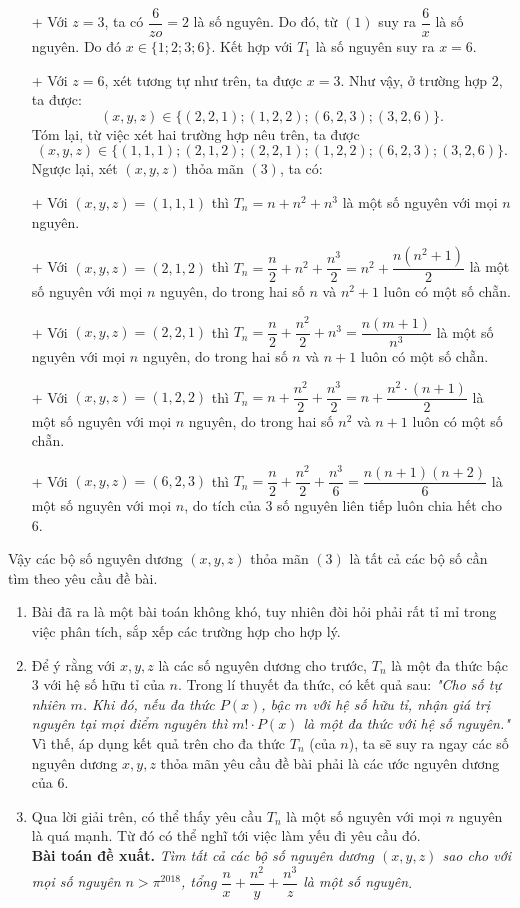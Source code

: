 \begin{bt}
{\begin{enumerate}[TH 1.]
\begin{itemize}
		\item[+] Với $z=3$, ta có $\dfrac{6}{zo}=2$ là số nguyên. Do đó, từ $(1)$ suy ra $\dfrac{6}{x}$ là số nguyên. Do đó $x \in \{1;2;3;6\}.$ Kết hợp với $T_1$ là số nguyên suy ra $x=6$.
		\item[+] Với $z=6$, xét tương tự như trên, ta được $x=3$.
		 Như vậy, ở trường hợp $2$, ta được:
		$$(x,y,z) \in \{(2,2,1); (1,2,2); (6,2,3); (3,2,6)\}.$$
		Tóm lại, từ việc xét hai trường hợp  nêu trên, ta được
		$$(x,y,z) \in \{(1,1,1); (2,1,2); (2,2,1); (1,2,2); (6,2,3); (3,2,6)\}.$$
		Ngược lại, xét $(x,y,z)$ thỏa mãn $(3)$, ta có:
		\item[+]  Với $(x,y,z)=(1,1,1)$ thì $T_n=n+n^2+n^3$ là một số nguyên với mọi $n$ nguyên.
		\item[+] Với $(x,y,z)=(2,1,2)$ thì $T_n=\dfrac{n}{2}+n^2+\dfrac{n^3}{2}=n^2+\dfrac{n(n^2+1)}{2}$ là một số nguyên với mọi $n$ nguyên, do trong hai số $n$ và $n^2+1$ luôn có một số chẵn.
		\item[+] Với $(x,y,z)=(2,2,1)$ thì $T_n=\dfrac{n}{2}+\dfrac{n^2}{2}+n^3=\dfrac{n(m+1)}{n^3}$ là một số nguyên với mọi $n$ nguyên, do trong hai số $n$ và $n+1$ luôn có một số chẵn.
		\item[+]  Với $(x,y,z)=(1,2,2)$ thì $T_n=n+\dfrac{n^2}{2}+\dfrac{n^3}{2}=n+\dfrac{n^2\cdot (n+1)}{2}$ là một số nguyên với mọi $n$ nguyên, do trong hai số $n^2$ và $n+1$ luôn có một số chẵn.
		\item[+] Với $(x,y,z)=(6,2,3)$ thì $T_n=\dfrac{n}{2}+\dfrac{n^2}{2}+\dfrac{n^3}{6}=\dfrac{n(n+1)(n+2)}{6}$ là một số nguyên với mọi $n$, do tích của $3$ số nguyên liên tiếp luôn chia hết cho $6$.
	\end{itemize}
Vậy các bộ số nguyên dương $(x,y,z)$ thỏa mãn $(3)$ là tất cả các bộ số cần tìm theo yêu cầu đề bài.
	\end{enumerate}
\begin{nx}\hfill
	\begin{enumerate}[1.]
		\item Bài đã ra là một bài toán không khó, tuy nhiên đòi hỏi phải rất tỉ mỉ trong việc phân tích, sắp xếp các trường hợp cho hợp lý.
		\item Để ý rằng với $x,y,z$ là các số nguyên dương cho trước, $T_n$ là một đa thức bậc $3$ với hệ số hữu tỉ của $n$. Trong lí thuyết đa thức, có kết quả sau:
		\textit{"Cho số tự nhiên $m$. Khi đó, nếu đa thức $P(x)$, bậc $m$ với hệ số hữu tỉ, nhận giá trị nguyên tại mọi điểm nguyên thì $m!\cdot P(x)$ là một đa thức với hệ số nguyên."}
		Vì thế, áp dụng kết quả trên cho đa thức $T_n$ (của $n$), ta sẽ suy ra ngay các số nguyên dương $x,y,z$ thỏa mãn yêu cầu đề bài phải là các ước nguyên dương của $6$.
		\item Qua lời giải trên, có thể thấy yêu cầu $T_n$ là một số nguyên với mọi $n$ nguyên là quá mạnh. Từ đó có thể nghĩ tới việc làm yếu đi yêu cầu đó.\\
		\textbf{Bài toán đề xuất.} {\em{Tìm tất cả các bộ số nguyên dương $(x,y,z)$ sao cho với mọi số nguyên $n>\pi^{2018}$, tổng $\dfrac{n}{x}+\dfrac{n^2}{y}+\dfrac{n^3}{z}$ là một số nguyên}}.
	\end{enumerate}
\end{nx}		
}
\end{bt}	
